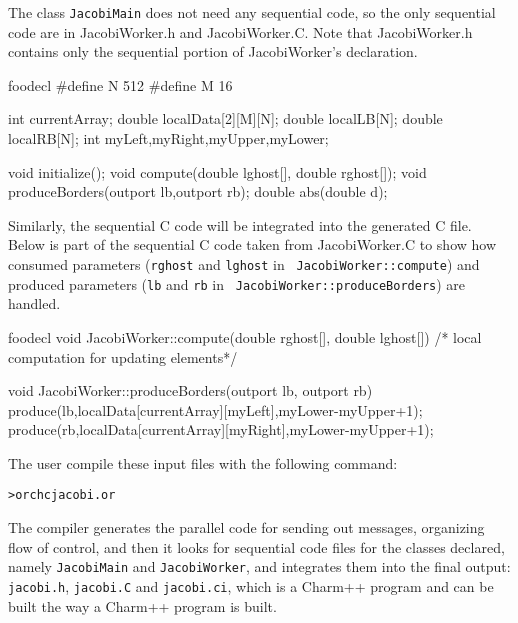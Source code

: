 \documentclass[10pt]{article}
\def\smallfbox#1{{\small {\fbox{#1}}}}
\begin{document}
The class {\tt JacobiMain} does not need any sequential code, so the only
sequential code are in JacobiWorker.h and JacobiWorker.C. Note that
JacobiWorker.h contains only the sequential portion of JacobiWorker's
declaration. 

\begin{SaveVerbatim}{foodecl}
#define N 512
#define M 16

int currentArray;	
double localData[2][M][N]; 
double localLB[N];
double localRB[N];
int myLeft,myRight,myUpper,myLower;

void initialize();
void compute(double lghost[], double rghost[]);
void produceBorders(outport lb,outport rb);
double abs(double d);
\end{SaveVerbatim}
\vspace{0.1in}
\smallfbox{\BUseVerbatim{foodecl}}
\vspace{0.1in}

Similarly, the sequential C code will be integrated into the generated C file.
Below is part of the sequential C code taken from JacobiWorker.C to show how
consumed parameters ({\tt rghost} and {\tt lghost} in {\tt
JacobiWorker::compute}) and produced parameters ({\tt lb} and {\tt rb} in {\tt
JacobiWorker::produceBorders}) are handled.

\begin{SaveVerbatim}{foodecl}
void JacobiWorker::compute(double rghost[], double lghost[]){
    /* local computation for updating elements*/
}

void JacobiWorker::produceBorders(outport lb, outport rb){
    produce(lb,localData[currentArray][myLeft],myLower-myUpper+1);
    produce(rb,localData[currentArray][myRight],myLower-myUpper+1);
}
\end{SaveVerbatim}
\vspace{0.1in}
\smallfbox{\BUseVerbatim{foodecl}}
\vspace{0.1in}

The user compile these input files with the following command:

\begin{alltt}
> orchc jacobi.or
\end{alltt}

The compiler generates the parallel code for sending out messages, organizing
flow of control, and then it looks for sequential code files for the classes
declared, namely {\tt JacobiMain} and {\tt JacobiWorker}, and integrates them
into the final output: {\tt jacobi.h}, {\tt jacobi.C} and {\tt jacobi.ci}, which
is a Charm++ program and can be built the way a Charm++ program is built.
\end{document}
